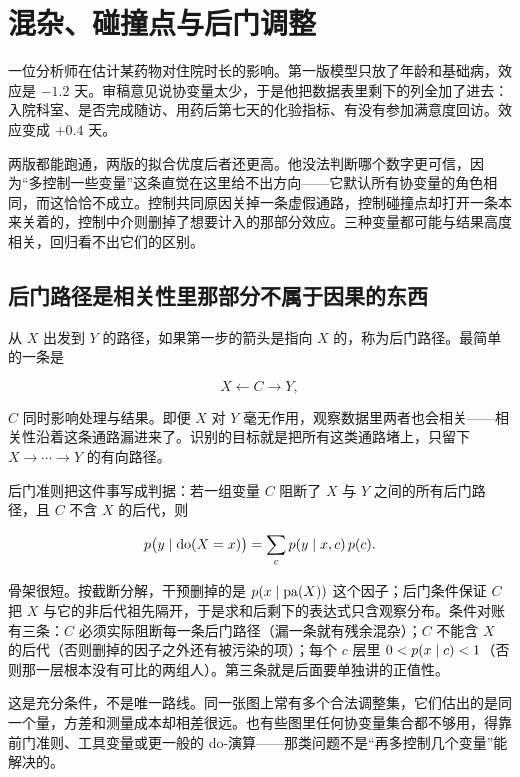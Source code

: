 \section{混杂、碰撞点与后门调整}
\label{sec:13-Machine-Learning/12-Causal-Inference/03}

一位分析师在估计某药物对住院时长的影响。第一版模型只放了年龄和基础病，效应是 \(-1.2\) 天。审稿意见说协变量太少，于是他把数据表里剩下的列全加了进去：入院科室、是否完成随访、用药后第七天的化验指标、有没有参加满意度回访。效应变成 \(+0.4\) 天。

两版都能跑通，两版的拟合优度后者还更高。他没法判断哪个数字更可信，因为``多控制一些变量''这条直觉在这里给不出方向——它默认所有协变量的角色相同，而这恰恰不成立。控制共同原因关掉一条虚假通路，控制碰撞点却打开一条本来关着的，控制中介则删掉了想要计入的那部分效应。三种变量都可能与结果高度相关，回归看不出它们的区别。

\subsection{后门路径是相关性里那部分不属于因果的东西}

从 \(X\) 出发到 \(Y\) 的路径，如果第一步的箭头是指向 \(X\) 的，称为后门路径。最简单的一条是

\[
X\longleftarrow C\longrightarrow Y,
\]

\(C\) 同时影响处理与结果。即便 \(X\) 对 \(Y\) 毫无作用，观察数据里两者也会相关——相关性沿着这条通路漏进来了。识别的目标就是把所有这类通路堵上，只留下 \(X\to\cdots\to Y\) 的有向路径。

后门准则把这件事写成判据：若一组变量 \(C\) 阻断了 \(X\) 与 \(Y\) 之间的所有后门路径，且 \(C\) 不含 \(X\) 的后代，则

\[
p\bigl(y\mid\operatorname{do}(X=x)\bigr)=\sum_c p(y\mid x,c)\,p(c).
\]

骨架很短。按截断分解，干预删掉的是 \(p(x\mid \operatorname{pa}(X))\) 这个因子；后门条件保证 \(C\) 把 \(X\) 与它的非后代祖先隔开，于是求和后剩下的表达式只含观察分布。条件对账有三条：\(C\) 必须实际阻断每一条后门路径（漏一条就有残余混杂）；\(C\) 不能含 \(X\) 的后代（否则删掉的因子之外还有被污染的项）；每个 \(c\) 层里 \(0<p(x\mid c)<1\)（否则那一层根本没有可比的两组人）。第三条就是后面要单独讲的正值性。

这是充分条件，不是唯一路线。同一张图上常有多个合法调整集，它们估出的是同一个量，方差和测量成本却相差很远。也有些图里任何协变量集合都不够用，得靠前门准则、工具变量或更一般的 do-演算——那类问题不是``再多控制几个变量''能解决的。

